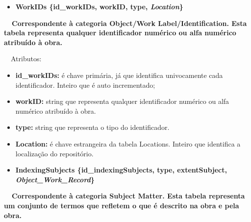 \documentclass[letterpaper]{article}
\newcommand\textstyleStrongEmphasis[1]{\textbf{#1}}
\newcommand\liststyleLi{%
\renewcommand\labelitemi{{\textbullet}}
\renewcommand\labelitemii{[27A2?]}
\renewcommand\labelitemiii{{\textbullet}}
\renewcommand\labelitemiv{{\textbullet}}
}
\newcommand\liststyleLxiv{%
\renewcommand\labelitemi{[27A2?]}
\renewcommand\labelitemii{[27A2?]}
\renewcommand\labelitemiii{[27A2?]}
\renewcommand\labelitemiv{[27A2?]}
}
\begin{document}
\bigskip

\liststyleLi
\begin{itemize}
\item {\bfseries
WorkIDs\textmd{ \{}\textmd{id\_workIDs}\textmd{, workID, type,
}\textmd{\textit{Location}}\textmd{\}}}
\end{itemize}
{\bfseries
\foreignlanguage{english}{\textmd{\ \ Correspondente \`a categoria
}}\textstyleStrongEmphasis{\foreignlanguage{english}{Object/Work
Label/Identification}}\foreignlanguage{english}{\textmd{. Esta
}}\textstyleStrongEmphasis{\foreignlanguage{english}{\textmd{tabela}}}\foreignlanguage{english}{\textmd{
representa qualquer identificador num\'erico ou alfa num\'erico
atribu\'ido \`a obra.}}}


\bigskip

{
\ \ Atributos:}

\liststyleLxiv
\begin{itemize}
\item {
\textbf{id\_}\textbf{workIDs}\textbf{: }\'e chave prim\'aria, j\'a que
identifica univocamente cada identificador. Inteiro que \'e auto
incrementado;}
\item {
\textbf{workID: }string que representa qualquer identificador num\'erico
ou alfa num\'erico atribu\'ido \`a obra.}
\item {
\textbf{type: }string que representa o tipo do identificador.}
\item {
\textbf{Location:} \'e chave estrangeira da tabela Locations. Inteiro
que identifica a localiza\c{c}\~ao do reposit\'orio.}
\end{itemize}

\bigskip

\liststyleLi
\begin{itemize}
\item {\bfseries
IndexingSubjects\textmd{ \{}\textmd{id\_indexingSubjects}\textmd{, type,
extentSubject, }\textmd{\textit{Object\_Work\_Record}}\textmd{\}}}
\end{itemize}
{\bfseries
\foreignlanguage{english}{\textmd{\ \ Correspondente \`a categoria
}}\textstyleStrongEmphasis{\foreignlanguage{english}{Subject
Matter}}\foreignlanguage{english}{\textmd{. Esta
}}\textstyleStrongEmphasis{\foreignlanguage{english}{\textmd{tabela}}}\foreignlanguage{english}{\textmd{
representa um conjunto de termos que refletem o que \'e descrito na
obra e pela obra.}}}
\end{document}
